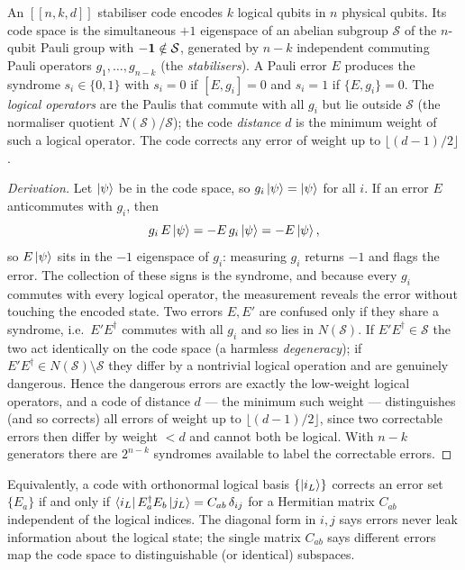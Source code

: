 \begin{statement}
\label{stmt:stabiliser-code}
An $[[n,k,d]]$ stabiliser code encodes $k$ logical qubits in $n$
physical qubits. Its code space is the simultaneous $+1$ eigenspace of
an abelian subgroup $\mathcal S$ of the $n$-qubit Pauli group with
$-\mathbf{1}\notin\mathcal S$, generated by $n-k$ independent commuting Pauli
operators $g_1,\dots,g_{n-k}$ (the \emph{stabilisers}). A Pauli error
$E$ produces the syndrome $s_i\in\{0,1\}$ with $s_i=0$ if $[E,g_i]=0$
and $s_i=1$ if $\{E,g_i\}=0$. The \emph{logical operators} are the
Paulis that commute with all $g_i$ but lie outside $\mathcal S$ (the
normaliser quotient $N(\mathcal S)/\mathcal S$); the code \emph{distance}
$d$ is the minimum weight of such a logical operator. The code corrects
any error of weight up to $\lfloor(d-1)/2\rfloor$.
\end{statement}

\begin{proof}[Derivation]
Let $\ket{\psi}$ be in the code space, so $g_i\ket{\psi}=\ket{\psi}$ for
all $i$. If an error $E$ anticommutes with $g_i$, then
\begin{equation}
g_i\,E\ket{\psi}=-E\,g_i\ket{\psi}=-E\ket{\psi},
\end{equation}
so $E\ket{\psi}$ sits in the $-1$ eigenspace of $g_i$: measuring $g_i$
returns $-1$ and flags the error. The collection of these signs is the
syndrome, and because every $g_i$ commutes with every logical operator,
the measurement reveals the error without touching the encoded state.
Two errors $E,E'$ are confused only if they share a syndrome, i.e.\
$E'E^\dagger$ commutes with all $g_i$ and so lies in $N(\mathcal S)$. If
$E'E^\dagger\in\mathcal S$ the two act identically on the code space (a
harmless \emph{degeneracy}); if $E'E^\dagger\in N(\mathcal
S)\setminus\mathcal S$ they differ by a nontrivial logical operation and
are genuinely dangerous. Hence the dangerous errors are exactly the
low-weight logical operators, and a code of distance $d$ --- the minimum
such weight --- distinguishes (and so corrects) all errors of weight up
to $\lfloor(d-1)/2\rfloor$, since two correctable errors then differ by
weight $<d$ and cannot both be logical. With $n-k$ generators there are
$2^{n-k}$ syndromes available to label the correctable errors.
\end{proof}

\begin{statement}
\label{stmt:knill-laflamme}
Equivalently, a code with orthonormal logical basis $\{\ket{i_L}\}$
corrects an error set $\{E_a\}$ if and only if
$\bra{i_L}E_a^\dagger E_b\ket{j_L}=C_{ab}\,\delta_{ij}$ for a Hermitian
matrix $C_{ab}$ independent of the logical indices. The diagonal form in
$i,j$ says errors never leak information about the logical state; the
single matrix $C_{ab}$ says different errors map the code space to
distinguishable (or identical) subspaces.
\end{statement}

